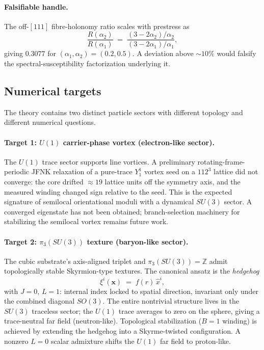 \paragraph{Falsifiable handle.}
The off-$[111]$ fibre-holonomy ratio scales with prestress as
\begin{equation}
  \frac{R(\alpha_2)}{R(\alpha_1)}
  \;=\;
  \frac{(3-2\alpha_2)/\alpha_2}{(3-2\alpha_1)/\alpha_1},
  \label{eq:holonomy-ratio}
\end{equation}
giving $0.3077$ for $(\alpha_1,\alpha_2)=(0.2,0.5)$.
A deviation above $\sim 10\%$ would falsify the spectral-susceptibility factorization underlying it.

\subsection{Numerical targets}
\label{subsec:numerical-targets}

The theory contains two distinct particle sectors with different topology and different numerical
questions.

\paragraph{Target 1: $U(1)$ carrier-phase vortex (electron-like sector).}
The $U(1)$ trace sector supports line vortices.
A preliminary rotating-frame-periodic JFNK relaxation of a pure-trace $Y_1^1$ vortex seed on a
$112^3$ lattice did not converge: the core drifted $\approx19$ lattice units off the symmetry axis,
and the measured winding changed sign relative to the seed.
This is the expected signature of semilocal orientational moduli with a dynamical $SU(3)$ sector.
A converged eigenstate has not been obtained; branch-selection machinery for stabilizing the semilocal
vortex remains future work.

\paragraph{Target 2: $\pi_3(SU(3))$ texture (baryon-like sector).}
The cubic substrate's axis-aligned triplet and $\pi_3(SU(3))=\mathbb{Z}$ admit topologically stable
Skyrmion-type textures.
The canonical ansatz is the \emph{hedgehog}
\begin{equation}
  \xi^i(\mathbf{x}) \;=\; f(r)\,\hat x^i,
  \label{eq:hedgehog}
\end{equation}
with $J=0$, $L=1$: internal index locked to spatial direction, invariant only under the combined
diagonal $SO(3)$.
The entire nontrivial structure lives in the $SU(3)$ traceless sector; the $U(1)$ trace averages to
zero on the sphere, giving a trace-neutral far field (neutron-like).
Topological stabilization ($B=1$ winding) is achieved by extending the hedgehog into a Skyrme-twisted
configuration.
A nonzero $L=0$ scalar admixture shifts the $U(1)$ far field to proton-like.

